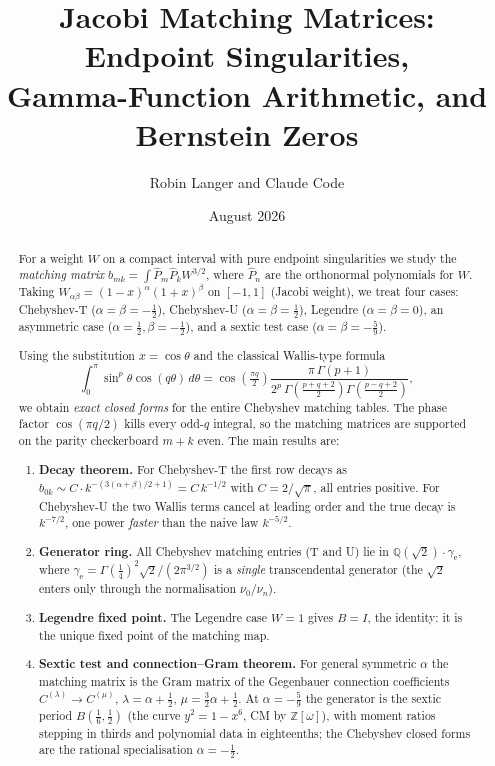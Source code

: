 \documentclass[11pt,a4paper]{article}
\title{\textbf{Jacobi Matching Matrices: Endpoint Singularities,\\
       Gamma-Function Arithmetic, and Bernstein Zeros}}
\author{Robin Langer and Claude Code}
\date{August 2026}
\newcommand{\Z}{\mathbb{Z}}
\newcommand{\G}{\Gamma}
\begin{document}
\maketitle

\begin{abstract}
For a weight $W$ on a compact interval with pure endpoint singularities we
study the \emph{matching matrix} $b_{mk}=\int \widehat P_m \widehat P_k W^{3/2}$,
where $\widehat P_n$ are the orthonormal polynomials for $W$.
Taking $W_{\alpha\beta}=(1-x)^\alpha(1+x)^\beta$ on $[-1,1]$ (Jacobi weight),
we treat four cases: Chebyshev-T ($\alpha=\beta=-\tfrac12$),
Chebyshev-U ($\alpha=\beta=\tfrac12$), Legendre ($\alpha=\beta=0$),
an asymmetric case ($\alpha=\tfrac12,\beta=-\tfrac12$),
and a sextic test case ($\alpha=\beta=-\tfrac59$).

Using the substitution $x=\cos\theta$ and the classical Wallis-type formula
\[
  \int_0^\pi \sin^p\theta\cos(q\theta)\,d\theta
  = \cos\!\left(\tfrac{\pi q}{2}\right)
  \frac{\pi\,\G(p{+}1)}{2^p\,\G\!\left(\tfrac{p+q+2}{2}\right)\G\!\left(\tfrac{p-q+2}{2}\right)},
\]
we obtain \emph{exact closed forms} for the entire Chebyshev matching tables.
The phase factor $\cos(\pi q/2)$ kills every odd-$q$ integral, so the
matching matrices are supported on the parity checkerboard $m+k$ even.
The main results are:

\begin{enumerate}
\item \textbf{Decay theorem.} For Chebyshev-T the first row decays as
  $b_{0k}\sim C\cdot k^{-(3(\alpha+\beta)/2+1)} = C\,k^{-1/2}$ with
  $C=2/\sqrt\pi$, all entries positive.  For Chebyshev-U the two Wallis
  terms cancel at leading order and the true decay is $k^{-7/2}$, one
  power \emph{faster} than the naive law $k^{-5/2}$.

\item \textbf{Generator ring.} All Chebyshev matching entries (T and U)
  lie in $\mathbb{Q}(\sqrt{2})\cdot\gamma_\mathrm{e}$,
  where $\gamma_\mathrm{e}=\G(\tfrac14)^2\sqrt{2}/(2\pi^{3/2})$
  is a \emph{single} transcendental generator
  (the $\sqrt2$ enters only through the normalisation $\nu_0/\nu_n$).

\item \textbf{Legendre fixed point.} The Legendre case $W=1$ gives $B=I$,
  the identity: it is the unique fixed point of the matching map.

\item \textbf{Sextic test and connection--Gram theorem.} For general
  symmetric $\alpha$ the matching matrix is the Gram matrix of the
  Gegenbauer connection coefficients $C^{(\lambda)}\to C^{(\mu)}$,
  $\lambda=\alpha+\tfrac12$, $\mu=\tfrac32\alpha+\tfrac12$.  At
  $\alpha=-\tfrac59$ the generator is the sextic period
  $B(\tfrac16,\tfrac12)$ (the curve $y^2=1-x^6$, CM by $\Z[\omega]$), with
  moment ratios stepping in thirds and polynomial data in eighteenths; the
  Chebyshev closed forms are the rational specialisation $\alpha=-\tfrac12$.


\end{enumerate}
\end{abstract}
\end{document}
